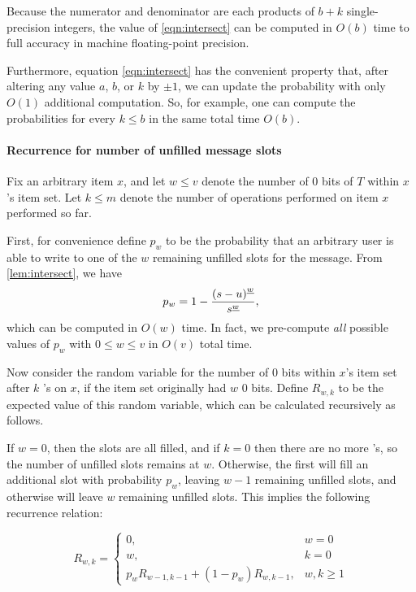 Because the numerator and denominator are each products of $b+k$ single-precision integers,
the value of \eqref{eqn:intersect} can be computed in $O(b)$ time to full accuracy in
machine floating-point precision.

Furthermore, equation \eqref{eqn:intersect} has the convenient property that, after altering any
value $a$, $b$, or $k$ by $\pm 1$, we can update the probability with only $O(1)$ additional
computation. So, for example, one can compute the probabilities for every $k\le b$ in the same
total time $O(b)$.

\paragraph{Recurrence for number of unfilled message slots}

Fix an arbitrary item $x$, and let $w\le v$ denote the number of 0 bits of $T$ within $x$'s item set. Let $k\le m$ denote the number of \Increment{} operations performed on item $x$ performed so far.

First, for convenience define $p_w$ to be the probability that an arbitrary user is able to
write to one of the $w$ remaining unfilled slots for the message. From \cref{lem:intersect}, we have
\begin{equation}
    p_w = 1 - \frac{{(s-u)}^{\underline{w}}}{{s}^{\underline{w}}},
    \label{eqn:pw}
\end{equation}
which can be computed in $O(w)$ time. In fact, we pre-compute \emph{all} possible values of $p_w$
with $0\le w\le v$ in $O(v)$ total time.

Now consider the random variable for the number of 0 bits within $x$'s item set after $k$ \Increment{}'s on $x$, if the item set originally had $w$ 0 bits.
Define $R_{w,k}$ to be the expected value of this random variable, which can be calculated recursively as follows.

If $w=0$, then the slots are all filled, and if $k=0$ then there are no more \Increment{}'s, so
the number of unfilled slots remains at $w$. Otherwise, the first \Increment{} will fill an additional slot
with probability $p_w$, leaving $w-1$ remaining unfilled slots, and otherwise will leave
$w$ remaining unfilled slots. This implies the following recurrence relation:

\[
R_{w,k} = \begin{cases}
    0,& w=0 \\
    w,& k=0 \\
    p_w R_{w-1,k-1} + (1 - p_w) R_{w,k-1},& w,k\ge 1
\end{cases}
\]


